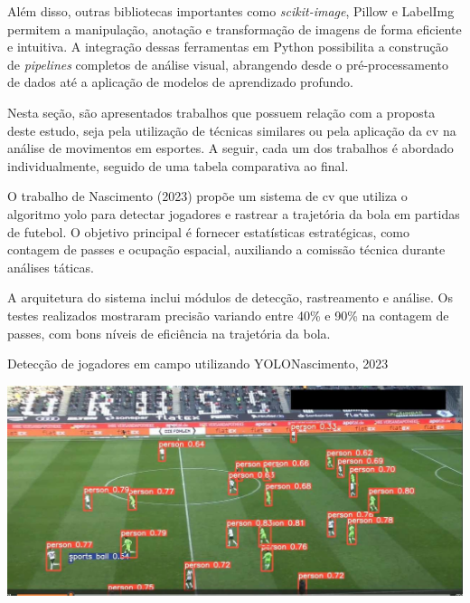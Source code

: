 Além disso, outras bibliotecas importantes como \textit{scikit-image}, Pillow e LabelImg permitem a manipulação, anotação e transformação de imagens de forma eficiente e intuitiva. 
A integração dessas ferramentas em Python possibilita a construção de \textit{pipelines} completos de análise visual, abrangendo desde o pré-processamento de dados até a aplicação de modelos de aprendizado profundo.

\label{sec:trabalhos-relacionados}

Nesta seção, são apresentados trabalhos que possuem relação com a proposta deste estudo, 
seja pela utilização de técnicas similares ou pela aplicação da \ac{cv} na análise de movimentos em esportes. A seguir, cada um dos trabalhos é abordado individualmente, seguido de uma tabela comparativa ao final.


O trabalho de Nascimento (2023) propõe um sistema de \ac{cv} que utiliza o algoritmo \ac{yolo} para detectar jogadores e rastrear a trajetória da bola em partidas de futebol. 
O objetivo principal é fornecer estatísticas estratégicas, como contagem de passes e ocupação espacial, auxiliando a comissão técnica durante análises táticas.

A arquitetura do sistema inclui módulos de detecção, rastreamento e análise. Os testes realizados mostraram precisão variando entre 40\% e 90\% na contagem de passes, com bons níveis de eficiência na trajetória da bola.

\begin{figura}{Detecção de jogadores em campo utilizando YOLO}{Nascimento, 2023}
    \begin{flushleft}
        \label{fig:Futebol}
        \includegraphics[width=0.48\linewidth]{resources/floats/ilustracoes/FUTEBOL.jpg}
    \end{flushleft}
\end{figura}
\FloatBarrier


